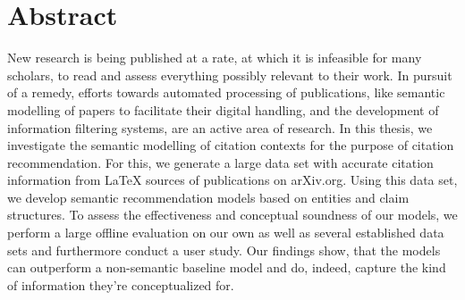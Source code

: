 \chapter*{Abstract}
New research is being published at a rate, at which it is %
infeasible for many scholars, to read and assess everything possibly %
relevant to their work. %
In pursuit of a remedy, efforts towards automated processing of publications, like semantic modelling of papers to facilitate their digital handling, and the development of information filtering systems, are an active area of research. %
In this thesis, we investigate the semantic modelling of citation contexts for the purpose of citation recommendation. For this, we generate a large data set with accurate citation information from \LaTeX{} sources of publications on arXiv.org. Using this data set, we develop semantic recommendation models based on entities and claim structures. To assess the effectiveness and conceptual soundness of our models, we perform a large offline evaluation on our own as well as several established data sets and furthermore conduct a user study. Our findings show, that the models can outperform a non-semantic baseline model and do, indeed, capture the kind of information they're conceptualized for.


